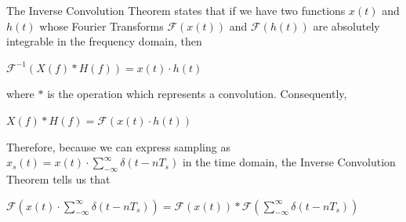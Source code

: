 \documentclass{article}
\begin{document}
The Inverse Convolution Theorem states that if we have two functions $x(t)$ and $h(t)$ whose Fourier Transforms $\mathcal{F}(x(t))$ and $\mathcal{F}(h(t))$ are absolutely integrable in the frequency domain,
then 
\begin{center}
    \begin{math}
        \mathcal{F}^{-1} \left(X(f) * H(f) \right) = x(t) \cdot h(t)
    \end{math}  
\end{center}
where $*$ is the operation which represents a convolution. %
Consequently,
\begin{center}
    \begin{math}
        X(f) * H(f) = \mathcal{F}\left(x(t) \cdot h(t)\right)
    \end{math}  
\end{center}

Therefore, because we can express sampling as $x_s(t) = x(t) \cdot \sum_{-\infty}^{\infty} \delta (t-nT_s)$ in the time domain, the Inverse Convolution Theorem tells us that %
\begin{center}
    \begin{math}
        \mathcal{F}\left(x(t) \cdot \sum_{-\infty}^{\infty} \delta (t-nT_s)\right) = \mathcal{F}(x(t)) * \mathcal{F}\left( \sum_{-\infty}^{\infty} \delta (t-nT_s) \right)
    \end{math}  
\end{center}
\end{document}
